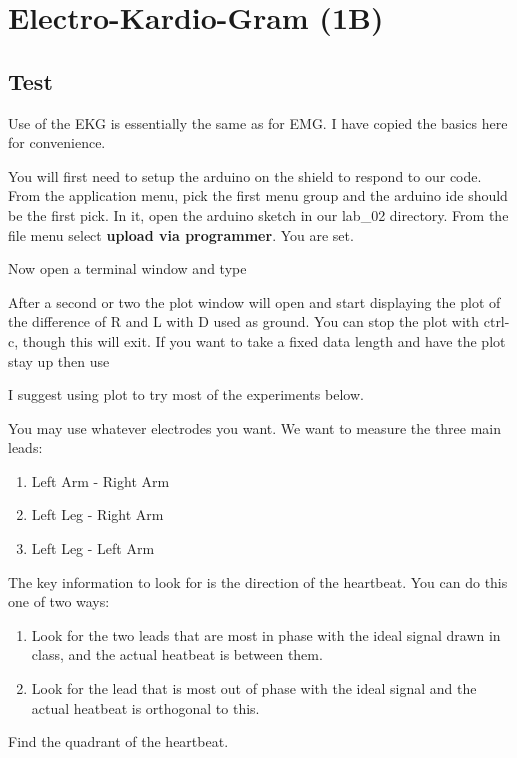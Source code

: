 \chapter{Electro-Kardio-Gram (1B)}

\section{Test}

Use of the EKG is essentially the same as for EMG.  I have copied the basics here for convenience.

You will first need to setup the arduino on the shield to respond to our code.  From the application menu, pick the first menu group and the arduino ide should be the first pick.  In it, open the arduino sketch in our lab\_02 directory.  From the file menu select \textbf{upload via programmer}.  You are set.

Now open a terminal window and type



After a second or two the plot window will open and start displaying the plot of the difference of R and L with D used as ground.  You can stop the plot with ctrl-c, though this will exit.  If you want to take a fixed data length and have the plot stay up then use


I suggest using plot to try most of the experiments below.

You may use whatever electrodes you want.  We want to measure the three main leads:
\begin{enumerate}
\item Left Arm - Right Arm
\item Left Leg - Right Arm
\item Left Leg - Left Arm
\end{enumerate}
The key information to look for is the direction of the heartbeat.  You can do this one of two ways:
\begin{enumerate}
\item Look for the two leads that are most in phase with the ideal signal drawn in class, and the actual heatbeat is between them.
\item Look for the lead that is most out of phase with the ideal signal and the actual heatbeat is orthogonal to this.
\end{enumerate}
Find the quadrant of the heartbeat.


